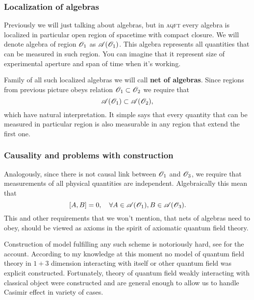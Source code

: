 \documentclass[10pt,t]{beamer}
\begin{document}
\begin{frame}
  \frametitle{Localization of algebras}


  Previously we will just talking about algebras, but in \textsc{aqft}
  every algebra is localized in particular open region of spacetime
  with compact closure. We will denote algebra of region $\mathcal{O}_{ 1 }$
  as $\mathcal{A}( \mathcal{O}_{ 1 } )$. This algebra represents all quantities
  that can be measured in such region. You can imagine that it represent
  size of experimental aperture and span of time when it's working.

  Family of all such localized algebras we will call \textbf{net of
    algebras}. Since regions from previous picture obeys relation
  $\mathcal{O}_{ 1 } \subset \mathcal{O}_{ 2 }$ we require that
  \begin{equation}
    \label{eq:Overview-of-Herdegens-approach-ETC-05}
    \mathcal{A}( \mathcal{O}_{ 1 } ) \subset \mathcal{A}( \mathcal{O}_{ 2 } ),
  \end{equation}
  which have natural interpretation. It simple says that every quantity
  that can be measured in particular region is also measurable in any
  region that extend the first one.

\end{frame}





\begin{frame}
  \frametitle{Causality and problems with construction}


  Analogously, since there is not causal link between $\mathcal{O}_{ 1 }$ and
  $\mathcal{O}_{ 3 }$, we require that measurements of all physical quantities
  are independent. Algebraically this mean that
  \begin{equation}
    \label{eq:Overview-of-Herdegens-approach-ETC-06}
    [ A, B ] = 0, \quad
    \forall A \in \mathcal{A}( \mathcal{O}_{ 1 } ), B \in \mathcal{A}( \mathcal{O}_{ 3 } ).
  \end{equation}
  This and other requirements that we won't mention, that nets of algebras
  need to obey, should be viewed as axioms in the spirit of axiomatic
  quantum field theory.

  Construction of model fulfilling any such scheme is notoriously hard, see
  \parencite{Summers-Prespective-on-Constructive-ETC-Ver-2016} for the
  account. According to my knowledge at this moment no
  model of quantum field theory in $1 + 3$ dimension interacting with
  itself or other quantum field was explicit constructed. Fortunately,
  theory of quantum field weakly interacting with classical object
  were constructed and are general enough to allow us to handle Casimir
  effect in variety of cases.

\end{frame}
\end{document}
